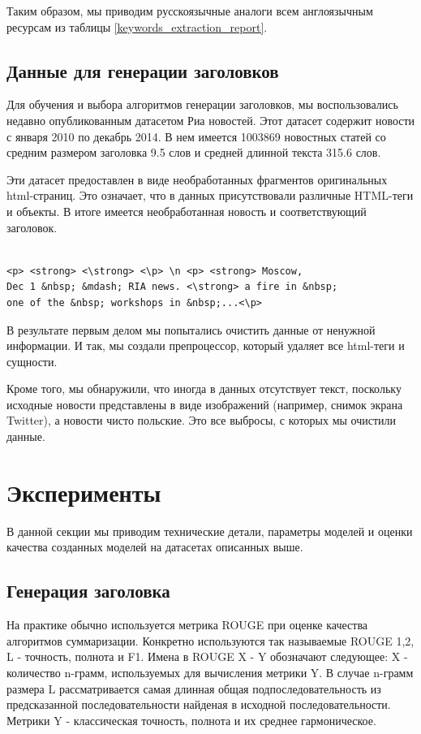 \documentclass[aps,%
12pt,%
final,%
oneside,
onecolumn,%
musixtex, %
superscriptaddress,%
centertags]{article} %
\begin{document}
Таким образом, мы приводим русскоязычные аналоги всем англоязычным ресурсам из таблицы \ref{keywords_extraction_report}.

\subsection{Данные для генерации заголовков}

Для обучения и выбора алгоритмов генерации заголовков, мы воспользовались недавно опубликованным
датасетом Риа новостей. Этот датасет содержит новости с января 2010 по декабрь 2014.
В нем имеется 1003869 новостных статей со средним размером заголовка 9.5 слов и
средней длинной текста 315.6 слов.

Эти датасет предоставлен в виде необработанных фрагментов оригинальных html-страниц.
Это означает, что в данных присутствовали различные HTML-теги и объекты.
В итоге имеется необработанная новость и соответствующий заголовок.

\begin{verbatim}

<p> <strong> <\strong> <\p> \n <p> <strong> Moscow,
Dec 1 &nbsp; &mdash; RIA news. <\strong> a fire in &nbsp;
one of the &nbsp; workshops in &nbsp;...<\p>
\end{verbatim}

В результате первым делом мы попытались очистить данные от ненужной информации. И так, мы создали препроцессор, который удаляет все html-теги и сущности.

Кроме того, мы обнаружили, что иногда в данных отсутствует текст, поскольку исходные новости представлены в виде изображений (например, снимок экрана Twitter), а новости чисто польские. Это все выбросы, с которых мы очистили данные.


\section{Эксперименты}
В данной секции мы приводим технические детали, параметры моделей и оценки качества созданных моделей на датасетах описанных выше.

\subsection{Генерация заголовка}
На практике обычно используется метрика ROUGE \cite{Lin: 2004} при оценке качества алгоритмов суммаризации. Конкретно используются так называемые ROUGE 1,2, L - точность, полнота и F1. Имена в ROUGE X - Y обозначают следующее: X - количество n-грамм, используемых для вычисления метрики Y. В случае n-грамм размера L рассматривается самая длинная общая подпоследовательность из предсказанной последовательности найденая в исходной последовательности. Метрики Y - классическая точность, полнота и их среднее гармоническое.
\end{document}

